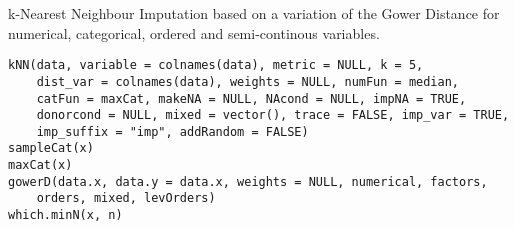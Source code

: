%
\begin{Description}\relax
k-Nearest Neighbour Imputation based on a variation of the Gower Distance for numerical, categorical, ordered and semi-continous variables.
\end{Description}
%
\begin{Usage}
\begin{verbatim}
kNN(data, variable = colnames(data), metric = NULL, k = 5,
    dist_var = colnames(data), weights = NULL, numFun = median,
    catFun = maxCat, makeNA = NULL, NAcond = NULL, impNA = TRUE,
    donorcond = NULL, mixed = vector(), trace = FALSE, imp_var = TRUE,
    imp_suffix = "imp", addRandom = FALSE)
sampleCat(x)
maxCat(x)
gowerD(data.x, data.y = data.x, weights = NULL, numerical, factors,
    orders, mixed, levOrders)
which.minN(x, n)
\end{verbatim}
\end{Usage}
%
